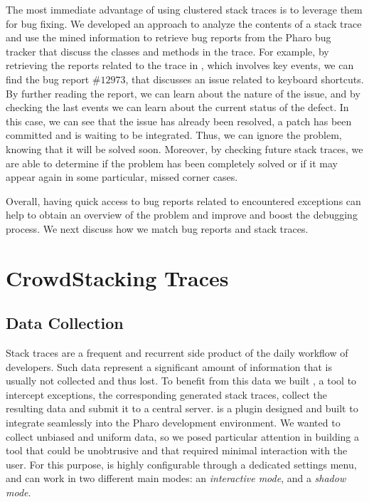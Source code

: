 The most immediate advantage of using clustered stack traces is to leverage them for bug fixing. We developed an approach to analyze the contents of a stack trace and use the mined information to retrieve bug reports from the Pharo bug tracker that discuss the classes and methods in the trace. For example, by retrieving the reports related to the trace in , which involves key events, we can find the bug report $\#12973$, that discusses an issue related to keyboard shortcuts. By further reading the report, we can learn about the nature of the issue, and by checking the last events we can learn about the current status of the defect. In this case, we can see that the issue has already been resolved, a patch has been committed and is waiting to be integrated. Thus, we can ignore the problem, knowing that it will be solved soon. Moreover, by checking future stack traces, we are able to determine if the problem has been completely solved or if it may appear again in some particular, missed corner cases.

Overall, having quick access to bug reports related to encountered exceptions can help to obtain an overview of the problem  and improve and boost the debugging process. We next discuss how we match bug reports and stack traces.


\section{CrowdStacking Traces}\label{sec:dataset}

\subsection{Data Collection}\label{sec:tool}

Stack traces are a frequent and recurrent side product of the daily workflow of developers. Such data represent a significant amount of information that is usually not collected and thus lost. To benefit from this data we built \shr, a tool to intercept exceptions, the corresponding generated stack traces, collect the resulting data and submit it to a central server. \shr is a plugin designed and built to integrate seamlessly into the Pharo development environment. We wanted to collect unbiased and uniform data, so we posed particular attention in building a tool that could be unobtrusive and that required minimal interaction with the user. For this purpose, \shr is highly configurable through a dedicated settings menu, and can work in two different main modes: an \emph{interactive mode}, and a \emph{shadow mode}.

